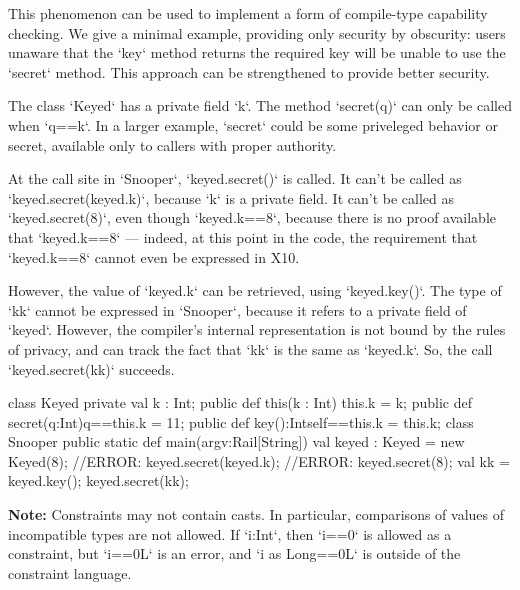 \begin{ex}
This phenomenon can be used to implement a form of compile-type capability
checking. We give a minimal example, providing only security by obscurity: 
users unaware that the \xcd`key` method returns the required key will be
unable to use the \xcd`secret` method.  This approach can be strengthened to
provide better security.

The class \xcd`Keyed` has a private field \xcd`k`.  The method \xcd`secret(q)`
can only be called when \xcd`q==k`. In a larger example, \xcd`secret` could be
some priveleged behavior or secret, available only to callers with proper
authority.

At the call site in \xcd`Snooper`, \xcd`keyed.secret()` is called.
It can't be called as \xcd`keyed.secret(keyed.k)`, because \xcd`k` is a private
field.
It can't be called as \xcd`keyed.secret(8)`, even though \xcd`keyed.k==8`,
because there
is no proof available that \xcd`keyed.k==8` --- indeed, at this point in the
code, the requirement that \xcd`keyed.k==8` cannot even be expressed in X10.

However,  the value of \xcd`keyed.k` can be retrieved, using
\xcd`keyed.key()`.   
The type of \xcd`kk` cannot be expressed in \xcd`Snooper`, because it refers to
a private field of \xcd`keyed`.  However, the compiler's internal
representation is not bound by the rules of privacy, and can track the fact
that \xcd`kk` is the same as \xcd`keyed.k`.  So, the call \xcd`keyed.secret(kk)`
succeeds.
\begin{xten}
class Keyed {
  private val k : Int;
  public def this(k : Int) {
    this.k = k; 
  }
  public def secret(q:Int){q==this.k} = 11;
  public def key():Int{self==this.k} = this.k;
}
class Snooper {
  public static def main(argv:Rail[String]) {
    val keyed : Keyed = new Keyed(8);
    //ERROR: keyed.secret(keyed.k);
    //ERROR: keyed.secret(8);
    val kk = keyed.key();
    keyed.secret(kk);
  }
}

\end{xten}
%


\end{ex}


{\bf Note:} Constraints may not contain casts.   In particular, comparisons of
values of incompatible types are not allowed.  If \xcd`i:Int`, then \xcd`i==0`
is allowed as a constraint, but \xcd`i==0L` is an error, and 
\xcd`i as Long==0L` is outside of the constraint language.


